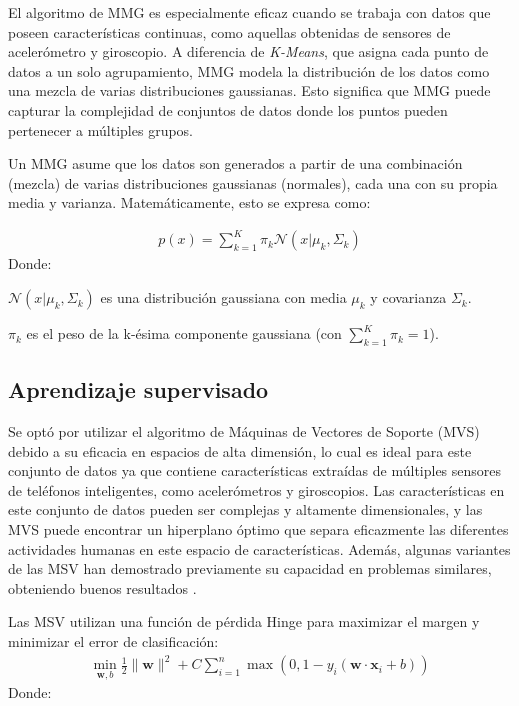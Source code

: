 \documentclass{esannV2}
\begin{document}
El algoritmo de MMG es especialmente eficaz cuando se trabaja con datos que poseen características continuas, como aquellas obtenidas de sensores de acelerómetro y giroscopio. A diferencia de \textit{K-Means}, que asigna cada punto de datos a un solo agrupamiento, MMG modela la distribución de los datos como una mezcla de varias distribuciones gaussianas. Esto significa que MMG puede capturar la complejidad de conjuntos de datos donde los puntos pueden pertenecer a múltiples grupos.

Un MMG asume que los datos son generados a partir de una combinación (mezcla) de varias distribuciones gaussianas (normales), cada una con su propia media y varianza. Matemáticamente, esto se expresa como:

\begin{eqnarray}
p(x) = \sum_{k=1}^{K} \pi_{k} \mathcal{N}(x | \mu_{k}, \Sigma_{k})
\end{eqnarray}
Donde:

$\mathcal{N}(x | \mu_{k}, \Sigma_{k})$ es una distribución gaussiana con media $\mu_{k}$ y covarianza $\Sigma_{k}$.


$\pi_{k}$ es el peso de la k-ésima componente gaussiana (con $\sum_{k=1}^{K} \pi_{k} = 1$).


\subsection{Aprendizaje supervisado}
Se optó por utilizar el algoritmo de Máquinas de Vectores de Soporte (MVS) debido a su eficacia en espacios de alta dimensión, lo cual es ideal para este conjunto de datos ya que contiene características extraídas de múltiples sensores de teléfonos inteligentes, como acelerómetros y giroscopios. Las características en este conjunto de datos pueden ser complejas y altamente dimensionales, y las MVS puede encontrar un hiperplano óptimo que separa eficazmente las diferentes actividades humanas en este espacio de características. Además, algunas variantes de las MSV han demostrado previamente su capacidad en problemas similares, obteniendo buenos resultados \cite{anguitaSVM}.

Las MSV utilizan una función de pérdida Hinge para maximizar el margen y minimizar el error de clasificación:
\begin{eqnarray}
\min_{\mathbf{w}, b} \frac{1}{2} \| \mathbf{w} \|^2 + C \sum_{i=1}^n \max(0, 1 - y_i (\mathbf{w} \cdot \mathbf{x}_i + b))
\end{eqnarray}
Donde:
\end{document}
